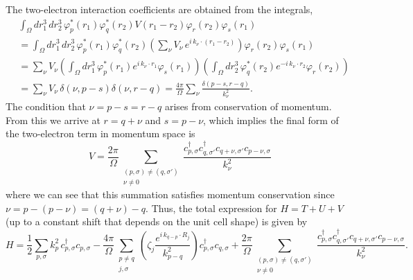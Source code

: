 \documentclass[superscriptaddress,aps,pra,nofootinbib,notitlepage,10pt,longbibliography]{revtex4-1}
\begin{document}
The two-electron interaction coefficients are obtained from the integrals,
\begin{align}
& \int_\Omega dr_1^3 \, dr_2^3 \, \varphi_p^*\left(r_1\right) \varphi_q^*\left(r_2\right) V\left(r_1 - r_2\right) \varphi_r\left(r_2\right) \varphi_s\left(r_1\right) \\
%
& = \int_\Omega dr_1^3 \, dr_2^3 \, \varphi_p^*\left(r_1\right) \varphi_q^*\left(r_2\right) \left(\sum_\nu V_\nu \, e^{i \, k_\nu \cdot \left(r_1 - r_2\right)} \right) \varphi_r\left(r_2\right) \varphi_s\left(r_1\right)\nonumber\\
%
& = \sum_\nu V_\nu \left(\int_\Omega dr_1^3 \,  \varphi_p^*\left(r_1\right) e^{i \, k_\nu \cdot r_1} \varphi_s\left(r_1\right) \right)\left(\int_\Omega  dr_2^3 \,  \varphi_q^*\left(r_2\right) e^{-i \, k_\nu \cdot r_2} \varphi_r\left(r_2\right)\right) \nonumber\\
%
& = \sum_\nu V_\nu \,\delta\left(\nu, p - s\right) \delta\left(\nu, r - q\right)  = \frac{4 \pi}{\Omega} \sum_\nu \frac{ \delta\left(p - s, r - q\right)}{k_\nu^2}\nonumber.
\end{align}
The condition that $\nu = p - s = r - q$ arises from conservation of momentum. From this we arrive at $r = q + \nu$ and $s = p - \nu$, which implies the final form of the two-electron term in momentum space is
\begin{equation}
V = \frac{2 \pi}{\Omega} \sum_{\substack{(p, \sigma) \neq (q, \sigma') \\ \nu \neq 0}} \frac{c^\dagger_{p,\sigma} c_{q,\sigma'}^\dagger c_{q + \nu,\sigma'} c_{p - \nu,\sigma}}{k_\nu^2}
 \end{equation}
 where we can see that this summation satisfies momentum conservation since $\nu = p - (p - \nu) = (q + \nu) -  q$. Thus, the total expression for $H = T + U + V$ (up to a constant shift that depends on the unit cell shape) is given by
 \begin{equation}
 H = \frac{1}{2} \sum_{p, \sigma} k_p^2 \, c_{p,\sigma}^\dagger c_{p,\sigma} - \frac{4 \pi}{\Omega} \sum_{\substack{p \neq q \\ j,\sigma}} \left(\zeta_j \frac{e^{i \, k_{q-p} \cdot R_j}}{k_{p-q}^2}\right) c^\dagger_{p, \sigma} c_{q, \sigma} + \frac{2 \pi}{\Omega} \sum_{\substack{(p, \sigma) \neq (q, \sigma') \\ \nu \neq 0}} \frac{c^\dagger_{p,\sigma} c_{q,\sigma'}^\dagger c_{q + \nu,\sigma'} c_{p - \nu,\sigma}}{k_\nu^2}.
 \label{eq:pw_ham}
 \end{equation}
\end{document}
